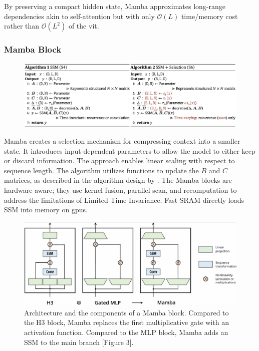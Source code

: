 By preserving a compact hidden state, Mamba approximates long-range dependencies akin to self-attention but with only \(\mathcal{O}(L)\) time/memory cost rather than \(\mathcal{O}(L^2)\) of the \acrfull{vit}.  


\subsubsection{Mamba Block}

\begin{figure}[h]
    \centering
    \includegraphics[width=1\linewidth]{figures/mamba_algorithm.png}
\end{figure}

Mamba\cite{gu_mamba_2024} creates a selection mechanism for compressing context into a smaller state. It introduces input-dependent parameters to allow the model to either keep or discard information. The approach enables linear scaling with respect to sequence length. The algorithm utilizes functions to update the \(B\) and \(C\) matrices, as described in the algorithm design by \textcite{gu_mamba_2024}. The Mamba blocks are hardware-aware; they use kernel fusion, parallel scan, and recomputation to address the limitations of Limited Time Invariance. Fast SRAM directly loads SSM into memory on \acrshort{gpu}s. 

\begin{figure}
    \centering
    \includegraphics[width=\linewidth]{figures/h3_mlp_mamba.png}
    \caption{Architecture and the components of a Mamba block. Compared to the H3 block, Mamba replaces the first multiplicative gate with an activation function. Compared to the MLP block, Mamba adds an SSM to the main branch \cite{gu_mamba_2024}[Figure 3].} 
    \label{fig:h3_mlp_mamba}
\end{figure}



